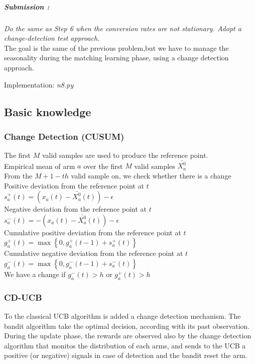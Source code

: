\subparagraph*{Submission : }
\textit{Do the same as Step 6 when the conversion rates are not stationary. Adopt a change-detection test approach.}\\

The goal is the same of the previous problem,but we have to manage the seasonality during the matching learning phase, using a change detection approach.

Implementation: \textit{n8.py}
\subsection*{Basic knowledge}
\subsubsection*{Change Detection (CUSUM)}
The first $M$ valid samples are used to produce the reference point.\\

Empirical mean of arm $a$ over the first $M$ valid samples $\bar{X_{a}^0}$\\

From the $M + 1-th$ valid sample on, we check whether there is a change\\

Positive deviation from the reference point at $t$ \hspace{0.2cm} $s_{a}^{+}(t) = (x_{a}(t) - \bar{X_{a}^0}(t)) - \epsilon$ \\

Negative deviation from the reference point at $t$ \hspace{0.2cm} $s_{a}^{-}(t) = -  (x_{a}(t) - \bar{X_{a}^0}(t)) - \epsilon$ \\

Cumulative positive deviation from the reference point at $t$ \hspace{0.2cm} $g_{a}^{+}(t) = \max \left\{0, g_{a}^{+}(t-1) + s_{a}^{+}(t) \right\}$ \\

Cumulative negative deviation from the reference point at $t$ \hspace{0.2cm} $g_{a}^{-}(t) = \max \left\{0, g_{a}^{-}(t-1) + s_{a}^{-}(t) \right\}$ \\

We have a change if \hspace{0.2cm} $g_{a}^{-}(t) > h$ or $g_{a}^{+}(t) > h$\\
\subsubsection*{CD-UCB} 
To the classical UCB algorithm is added a change detection mechanism. The bandit algorithm take the optimal decision, according with its past observation. During the update phase, the rewards are observed also by the change detection algorithm that monitos the distribution of each arms, and sends to the UCB a positive (or negative) signals in case of detection and the bandit reset the arm.

